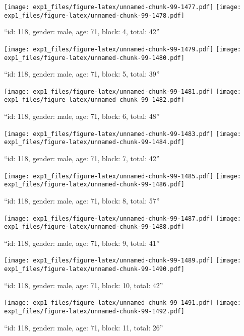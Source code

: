 \documentclass[,]{article}
\begin{document}
\texttt{[image: exp1\_files/figure-latex/unnamed-chunk-99-1477.pdf]}
\texttt{[image: exp1\_files/figure-latex/unnamed-chunk-99-1478.pdf]}

\newpage
[1] 

``id: 118, gender: male, age: 71, block: 4, total: 42''

\texttt{[image: exp1\_files/figure-latex/unnamed-chunk-99-1479.pdf]}
\texttt{[image: exp1\_files/figure-latex/unnamed-chunk-99-1480.pdf]}

\newpage
[1] 

``id: 118, gender: male, age: 71, block: 5, total: 39''

\texttt{[image: exp1\_files/figure-latex/unnamed-chunk-99-1481.pdf]}
\texttt{[image: exp1\_files/figure-latex/unnamed-chunk-99-1482.pdf]}

\newpage
[1] 

``id: 118, gender: male, age: 71, block: 6, total: 48''

\texttt{[image: exp1\_files/figure-latex/unnamed-chunk-99-1483.pdf]}
\texttt{[image: exp1\_files/figure-latex/unnamed-chunk-99-1484.pdf]}

\newpage
[1] 

``id: 118, gender: male, age: 71, block: 7, total: 42''

\texttt{[image: exp1\_files/figure-latex/unnamed-chunk-99-1485.pdf]}
\texttt{[image: exp1\_files/figure-latex/unnamed-chunk-99-1486.pdf]}

\newpage
[1] 

``id: 118, gender: male, age: 71, block: 8, total: 57''

\texttt{[image: exp1\_files/figure-latex/unnamed-chunk-99-1487.pdf]}
\texttt{[image: exp1\_files/figure-latex/unnamed-chunk-99-1488.pdf]}

\newpage
[1] 

``id: 118, gender: male, age: 71, block: 9, total: 41''

\texttt{[image: exp1\_files/figure-latex/unnamed-chunk-99-1489.pdf]}
\texttt{[image: exp1\_files/figure-latex/unnamed-chunk-99-1490.pdf]}

\newpage
[1] 

``id: 118, gender: male, age: 71, block: 10, total: 42''

\texttt{[image: exp1\_files/figure-latex/unnamed-chunk-99-1491.pdf]}
\texttt{[image: exp1\_files/figure-latex/unnamed-chunk-99-1492.pdf]}

\newpage
[1] 

``id: 118, gender: male, age: 71, block: 11, total: 26''
\end{document}

